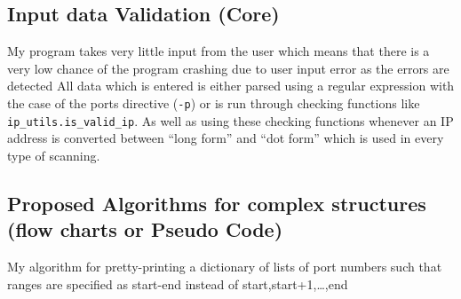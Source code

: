\documentclass[titlepage]{article}
\begin{document}
\subsection{Input data Validation (Core)}

My program takes very little input from the user which means that there is a very low chance of the program
crashing due to user input error as the errors are detected
All data which is entered is either parsed using a regular expression with the case of the
ports directive (\verb|-p|) or is run through checking functions like \verb|ip_utils.is_valid_ip|.
As well as using these checking functions whenever an IP address is converted between ``long form''
and ``dot form'' which is used in every type of scanning.

\subsection{Proposed Algorithms for complex structures (flow charts or Pseudo Code)}

\begin{algorithm}\label{collapse}

  \caption{My algorithm for pretty-printing a dictionary of lists of port numbers
  such that ranges are specified as start-end instead of start,start+1,\ldots,end}
  \begin{algorithmic}
            \EndIf
          \EndIf
        \EndFor
      \EndIf
    \EndFor
    \EndProcedure
  \end{algorithmic}

\end{algorithm}
\end{document}

